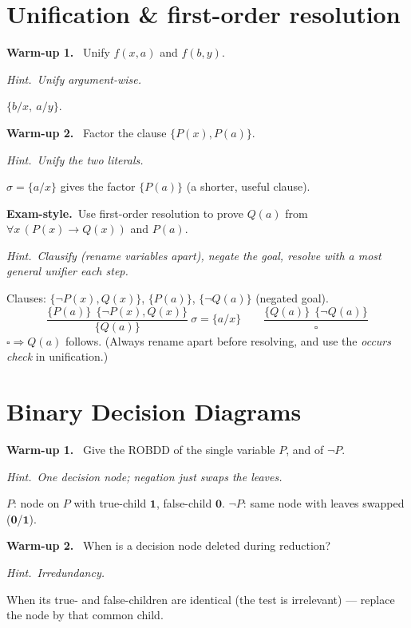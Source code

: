 \documentclass[11pt,a4paper]{article}
\newcommand{\hint}[1]{\par{\small\textcolor{accent}{\textit{Hint.}}\ \textit{#1}}\par\smallskip}
\newcommand{\warm}[1]{\smallskip\textbf{\textcolor{hi}{Warm-up #1.}}\ }
\newcommand{\exam}{\smallskip\textbf{\textcolor{warn}{Exam-style.}}\ }
\newcommand{\imp}{\rightarrow}
\begin{document}
\section{Unification \& first-order resolution}

\warm{1} Unify $f(x,a)$ and $f(b,y)$.
\hint{Unify argument-wise.}
\begin{sol}$\{b/x,\ a/y\}$.\end{sol}

\warm{2} Factor the clause $\{P(x),P(a)\}$.
\hint{Unify the two literals.}
\begin{sol}$\sigma=\{a/x\}$ gives the factor $\{P(a)\}$ (a shorter, useful clause).\end{sol}

\exam Use first-order resolution to prove $Q(a)$ from $\forall x\,(P(x)\imp Q(x))$ and $P(a)$.
\hint{Clausify (rename variables apart), negate the goal, resolve with a most general unifier each step.}
\begin{sol}
Clauses: $\{\neg P(x),Q(x)\}$, $\{P(a)\}$, $\{\neg Q(a)\}$ (negated goal).
\[
\frac{\{P(a)\}\ \ \{\neg P(x),Q(x)\}}{\{Q(a)\}}\ \sigma=\{a/x\}
\qquad
\frac{\{Q(a)\}\ \ \{\neg Q(a)\}}{\square}
\]
$\square\Rightarrow Q(a)$ follows. (Always rename apart before resolving, and use the \emph{occurs check} in unification.)
\end{sol}

\section{Binary Decision Diagrams}

\warm{1} Give the ROBDD of the single variable $P$, and of $\neg P$.
\hint{One decision node; negation just swaps the leaves.}
\begin{sol}$P$: node on $P$ with true-child $\mathbf 1$, false-child $\mathbf 0$. $\neg P$: same node with leaves swapped ($\mathbf 0$/$\mathbf 1$).\end{sol}

\warm{2} When is a decision node deleted during reduction?
\hint{Irredundancy.}
\begin{sol}When its true- and false-children are identical (the test is irrelevant) --- replace the node by that common child.\end{sol}
\end{document}
